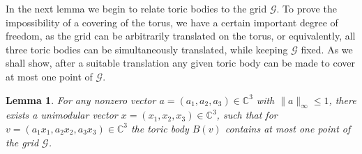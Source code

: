 \documentclass[12pt, a4paper]{article}
\theoremstyle{plain} %
\newtheorem{lemma}[theorem]{Lemma}       %
\theoremstyle{definition} %
\theoremstyle{remark} %
\begin{document}
In the next lemma we begin to relate toric bodies to the grid $\mathcal{G}$. To prove the impossibility of a covering of the torus, we have a certain important degree of freedom, as the grid can be arbitrarily translated on the torus, or equivalently, all three toric bodies can be simultaneously translated, while keeping $\mathcal{G}$ fixed. As we shall show, after a suitable translation any given toric body can be made to cover at most one point of $\mathcal{G}$.


\begin{lemma} \label{lem:grid_placement}
For any nonzero vector $a=(a_1, a_2, a_3) \in \mathbb{C}^3$ with $\|a\|_{\infty} \leq 1$, there exists a unimodular vector $x=(x_1, x_2, x_3) \in \mathbb{C}^3$, such that for $v=(a_1x_1, a_2x_2, a_3x_3) \in \mathbb{C}^3$ the toric body $B(v)$ contains at most one point of the grid $\mathcal{G}$.
\end{lemma}
\end{document}
